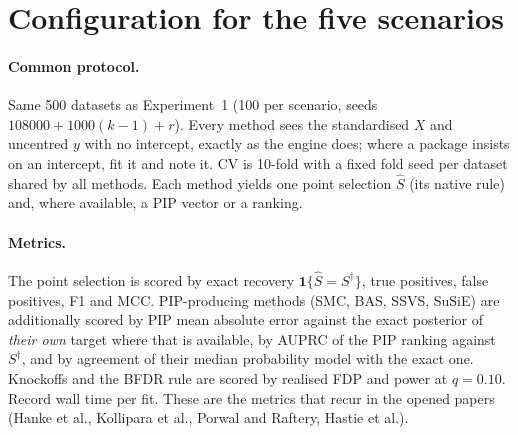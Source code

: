 \documentclass[11pt,letterpaper]{article}
\begin{document}
\section{Configuration for the five scenarios}\label{sec:spec}

\paragraph{Common protocol.} Same 500 datasets as Experiment~1 (100 per scenario, seeds $108000+1000(k-1)+r$). Every method sees the standardised $X$ and uncentred $y$ with no intercept, exactly as the engine does; where a package insists on an intercept, fit it and note it. CV is 10-fold with a fixed fold seed per dataset shared by all methods. Each method yields one point selection $\widehat S$ (its native rule) and, where available, a PIP vector or a ranking.

\paragraph{Metrics.} The point selection is scored by exact recovery $\mathbf 1\{\widehat S=S^\dagger\}$, true positives, false positives, F1 and MCC. PIP-producing methods (SMC, BAS, SSVS, SuSiE) are additionally scored by PIP mean absolute error against the exact posterior of \emph{their own} target where that is available, by AUPRC of the PIP ranking against $S^\dagger$, and by agreement of their median probability model with the exact one. Knockoffs and the BFDR rule are scored by realised FDP and power at $q=0.10$. Record wall time per fit. These are the metrics that recur in the opened papers (Hanke et al., Kollipara et al., Porwal and Raftery, Hastie et al.).
\end{document}
